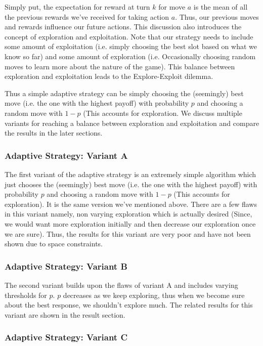 \documentclass[a4paper]{article}
\begin{document}
Simply put, the expectation for reward at turn $k$ for move $a$ is the mean of all the previous rewards we've received for taking action $a$. Thus, our previous moves and rewards influence our future actions.
This discussion also introduces the concept of exploration and exploitation. Note that our strategy needs to include some amount of exploitation (i.e. simply choosing the best slot based on what we know so far) and some amount of exploration (i.e. Occasionally choosing random moves to learn more about the nature of the game). This balance between exploration and exploitation leads to the Explore-Exploit dilemma.

Thus a simple adaptive strategy	can be simply choosing the (seemingly) best move (i.e. the one with the highest payoff) with probability $p$ and choosing a random move with $1-p$ (This accounts for exploration. We discuss multiple variants for reaching a balance between exploration and exploitation and compare the results in the later sections.

	\subsubsection{Adaptive Strategy: Variant A}

	The first variant of the adaptive strategy is an extremely simple algorithm which just chooses the (seemingly) best move (i.e. the one with the highest payoff) with probability $p$ and choosing a random move with $1-p$ (This accounts for exploration). It is the same version we've mentioned above. There are a few flaws in this variant namely, non varying exploration which is actually desired (Since, we would want more exploration initially and then decrease our exploration once we are sure). Thus, the results for this variant are very poor and have not been shown due to space constraints.
	
	\subsubsection{Adaptive Strategy: Variant B}
	
	The second variant builds upon the 	flaws of variant A and includes varying thresholds for $p$. $p$ decreases as we keep exploring, thus when we become sure about the best response, we shouldn't explore much. The related results for this variant are shown in the result section.
	
	\subsubsection{Adaptive Strategy: Variant C}
	
\end{document}
